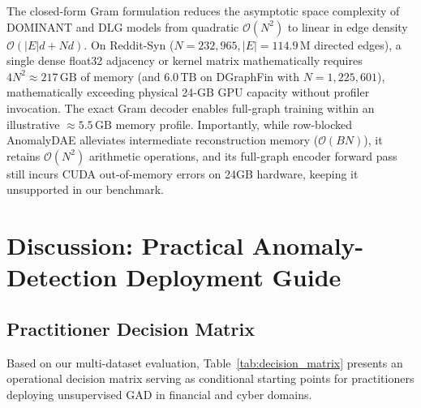 \documentclass[11pt,a4paper]{article}
\begin{document}
The closed-form Gram formulation reduces the asymptotic space complexity of DOMINANT and DLG models from quadratic $\mathcal{O}(N^2)$ to linear in edge density $\mathcal{O}(|E| d + N d)$. On Reddit-Syn ($N=232,965, |E|=114.9\,\mathrm{M}$ directed edges), a single dense float32 adjacency or kernel matrix mathematically requires $4 N^2 \approx 217\,\mathrm{GB}$ of memory (and $6.0\,\mathrm{TB}$ on DGraphFin with $N=1,225,601$), mathematically exceeding physical 24-GB GPU capacity without profiler invocation. The exact Gram decoder enables full-graph training within an illustrative $\approx 5.5\,\mathrm{GB}$ memory profile. Importantly, while row-blocked AnomalyDAE alleviates intermediate reconstruction memory ($\mathcal{O}(B N)$), it retains $\mathcal{O}(N^2)$ arithmetic operations, and its full-graph encoder forward pass still incurs CUDA out-of-memory errors on 24GB hardware, keeping it unsupported in our benchmark.

\section{Discussion: Practical Anomaly-Detection Deployment Guide}
\label{sec:discussion}

\subsection{Practitioner Decision Matrix}
Based on our multi-dataset evaluation, Table~\ref{tab:decision_matrix} presents an operational decision matrix serving as conditional starting points for practitioners deploying unsupervised GAD in financial and cyber domains.
\end{document}
